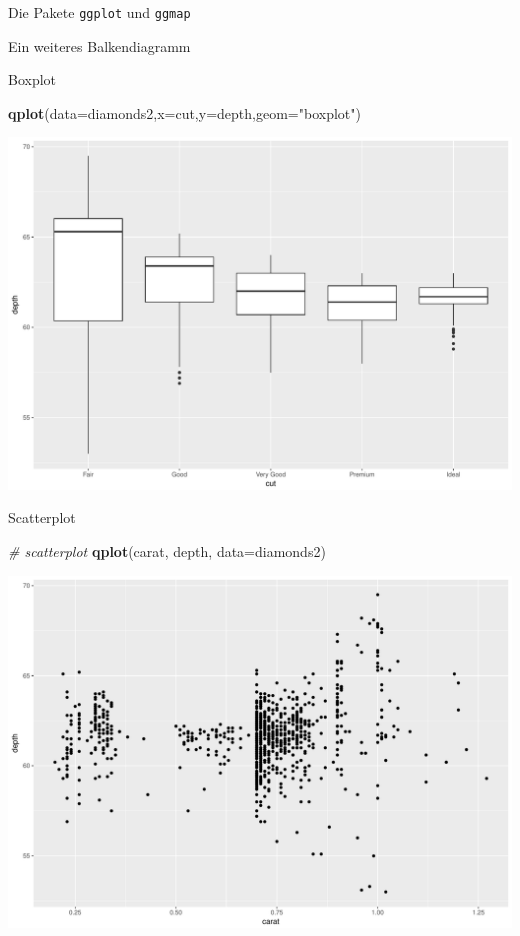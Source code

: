 \documentclass[ignorenonframetext,]{beamer}
\newenvironment{Shaded}{}{}
\newcommand{\KeywordTok}[1]{\textcolor[rgb]{0.00,0.44,0.13}{\textbf{{#1}}}}
\newcommand{\DataTypeTok}[1]{\textcolor[rgb]{0.56,0.13,0.00}{{#1}}}
\newcommand{\StringTok}[1]{\textcolor[rgb]{0.25,0.44,0.63}{{#1}}}
\newcommand{\CommentTok}[1]{\textcolor[rgb]{0.38,0.63,0.69}{\textit{{#1}}}}
\newcommand{\NormalTok}[1]{{#1}}
\begin{document}
\begin{frame}[fragile]{Die Pakete \texttt{ggplot} und \texttt{ggmap}}
\begin{block}{Ein weiteres Balkendiagramm}
\end{block}

\begin{block}{Boxplot}

\begin{Shaded}
\begin{Highlighting}[]
\KeywordTok{qplot}\NormalTok{(}\DataTypeTok{data=}\NormalTok{diamonds2,}\DataTypeTok{x=}\NormalTok{cut,}\DataTypeTok{y=}\NormalTok{depth,}\DataTypeTok{geom=}\StringTok{"boxplot"}\NormalTok{)}
\end{Highlighting}
\end{Shaded}

\includegraphics{R_intern_files/figure-beamer/unnamed-chunk-240-1.pdf}

\end{block}

\begin{block}{Scatterplot}

\begin{Shaded}
\begin{Highlighting}[]
\CommentTok{# scatterplot}
\KeywordTok{qplot}\NormalTok{(carat, depth, }\DataTypeTok{data=}\NormalTok{diamonds2)}
\end{Highlighting}
\end{Shaded}

\includegraphics{R_intern_files/figure-beamer/unnamed-chunk-241-1.pdf}


\end{block}
\end{frame}
\end{document}
